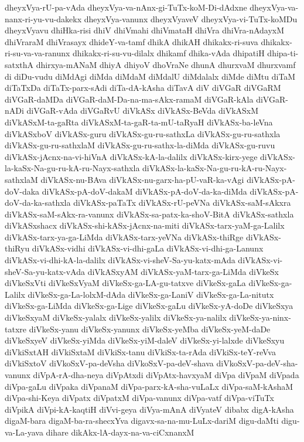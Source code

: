 {dheyxVya-rU-pa-vAda
dheyxVya-va-nAnx-gi-TuTx-koM-Di-dAdxne
dheyxVya-va-nanx-ri-yu-vu-dakekx
dheyxVya-vanunx
dheyxVyaveV
dheyxVya-vi-TuTx-koMDu
dheyxVyavu
dhiHka-risi
dhiV
dhiVmahi
dhiVmataH
dhiVra
dhiVra-nAdayxM
dhiVraraM
dhiVrasayx
dhideY-va-tamf
dhikA
dhikAH
dhikakx-ri-suva
dhikakx-ri-su-va-va-ranunx
dhikakx-ri-su-vu-dilalx
dhikamf
dhika-vAda
dhipatiH
dhipa-ti-satxthA
dhirxya-mANaM
dhiyA
dhiyoV
dhoVraNe
dhunA
dhurxvaM
dhurxvamf
di
diDu-vudu
diMdAgi
diMda
diMdaM
diMdalU
diMdalalx
diMde
diMtu
diTaM
diTaTxDa
diTaTx-parx-sAdi
diTa-dA-kAsha
diTavA
diV
diVGaR
diVGaRM
diVGaR-daMDa
diVGaR-daM-Da-na-ma-sAkx-ramaM
diVGaR-kAla
diVGaR-nADi
diVGaR-vAda
diVGaRvU
diVkASx
diVkASx-BeVda
diVkASxM
diVkASxM-ta-gaRta
diVkASxM-ta-gaR-ta-mU-taRyaH
diVkASx-ba-leVna
diVkASxboV
diVkASx-guru
diVkASx-gu-ru-sathxLa
diVkASx-gu-ru-sathxla
diVkASx-gu-ru-sathxlaM
diVkASx-gu-ru-sathx-la-diMda
diVkASx-gu-ruvu
diVkASx-jAcnx-na-vi-hiVnA
diVkASx-kA-la-dalilx
diVkASx-kirx-yege
diVkASx-la-kaSx-Na-gu-ru-kA-ru-Nayx-sathxla
diVkASx-la-kaSx-Na-gu-ru-kA-ru-Nayx-sathxlaM
diVkASx-nu-BAva
diVkASx-nu-garx-ha-pU-vaR-ka-vAgi
diVkASx-pA-doV-daka
diVkASx-pA-doV-dakaM
diVkASx-pA-doV-da-ka-diMda
diVkASx-pA-doV-da-ka-sathxla
diVkASx-paTaTx
diVkASx-rU-peVNa
diVkASx-saM-sAkxra
diVkASx-saM-sAkx-ra-vanunx
diVkASx-sa-patx-ka-shoV-BitA
diVkASx-sathxla
diVkASxshacx
diVkASx-shi-kASx-jAcnx-na-miti
diVkASx-tarx-yaM-ga-Lalilx
diVkASx-tarx-ya-ga-LiMda
diVkASx-tarx-yeVNa
diVkASx-thiRge
diVkASx-thiRyu
diVkASx-vidhi
diVkASx-vi-dhi-gaLa
diVkASx-vi-dhi-ga-Lanunx
diVkASx-vi-dhi-kA-la-dalilx
diVkASx-vi-sheV-Sa-yu-katx-mAda
diVkASx-vi-sheV-Sa-yu-katx-vAda
diVkASxyAM
diVkASx-yaM-tarx-ga-LiMda
diVkeSx
diVkeSxVti
diVkeSxVyaM
diVkeSx-ga-LA-gu-tatxve
diVkeSx-gaLa
diVkeSx-ga-Lalilx
diVkeSx-ga-La-lolxM-dAda
diVkeSx-ga-LaniV
diVkeSx-ga-La-nitutx
diVkeSx-ga-LiMda
diVkeSx-ga-Lige
diVkeSx-gaLu
diVkeSx-yA-doDe
diVkeSxya
diVkeSxyaM
diVkeSx-yalalx
diVkeSx-yalilx
diVkeSx-ya-nalilx
diVkeSx-ya-ninx-tatxre
diVkeSx-yanu
diVkeSx-yanunx
diVkeSx-yeMba
diVkeSx-yeM-daDe
diVkeSxyeV
diVkeSx-yiMda
diVkeSx-yiM-daleV
diVkeSx-yi-lalxde
diVkeSxyu
diVkiSxtAH
diVkiSxtaM
diVkiSx-tanu
diVkiSx-ta-rAda
diVkiSx-teY-reVva
diVkiSxtoV
diVkoSxV-pa-deVsha
diVkoSxV-pa-deV-shava
diVkoSxV-pa-deV-sha-vanunx
diVpA-rA-dha-neya
diVpAtxdi
diVpAtx-havxyaM
diVpa
diVpaM
diVpada
diVpa-gaLu
diVpaka
diVpanaM
diVpa-parx-kA-sha-vuLaLx
diVpa-saM-kAshaM
diVpa-shi-Keya
diVpatx
diVpatxM
diVpa-vanunx
diVpa-vatf
diVpa-viTuTx
diVpikA
diVpi-kA-kaqtiH
diVvi-geya
diVya-mAnA
diVyateV
dibabx
digA-kAsha
digaM-bara
digaM-ba-ra-shecxYva
digavx-sa-na-mu-LuLx-dariM
digu-daMti
digu-va-La-yava
dihare
dikAkx-lA-dayx-na-va-ciCxnanxM
}
